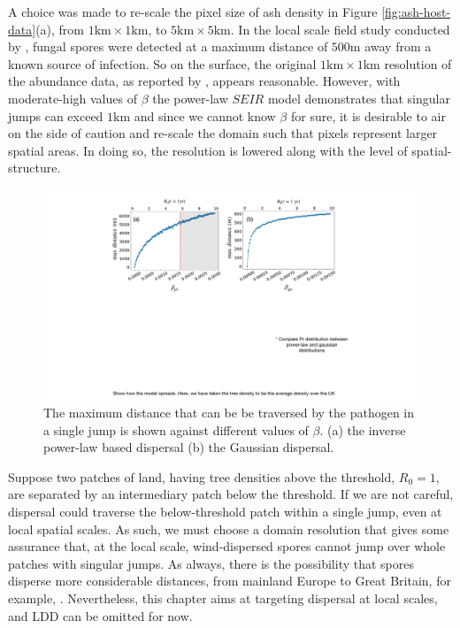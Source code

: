 A choice was made to re-scale the pixel size of ash density in Figure \ref{fig:ash-host-data}(a), from $1\mathrm{km} \times 1 \mathrm{km}$, to $5\mathrm{km} \times 5 \mathrm{km}$. In the local scale field study conducted by \cite{grosdidier2018tracking}, fungal spores were detected at a maximum distance of $500\mathrm{m}$ away from a known source of infection. So on the surface, the original $1\mathrm{km} \times 1 \mathrm{km}$ resolution of the abundance data, as reported by \cite{hill.data}, appears reasonable. However, with moderate-high values of $\beta$ the power-law $SEIR$ model demonstrates that singular jumps can exceed $1\mathrm{km}$ and since we cannot know $\beta$ for sure, it is desirable to air on the side of caution and re-scale the domain such that pixels represent larger spatial areas. In doing so, the resolution is lowered along with the level of spatial-structure. 

\begin{figure}
    \centering
    \includegraphics[scale=0.40]{chapter6/figures/fig5-beta-vs-max_d.pdf}
    \caption{The maximum distance that can be be traversed by the pathogen in a single jump is shown against different values of $\beta$. (a) the inverse power-law based dispersal (b) the Gaussian dispersal.}
    \label{fig:max_dist_vs_R0}
\end{figure}

Suppose two patches of land, having tree densities above the threshold, $R_0 = 1$, are separated by an intermediary patch below the threshold. If we are not careful, dispersal could traverse the below-threshold patch within a single jump, even at local spatial scales. As such, we must choose a domain resolution that gives some assurance that, at the local scale, wind-dispersed spores cannot jump over whole patches with singular jumps. As always, there is the possibility that spores disperse more considerable distances, from mainland Europe to Great Britain, for example, \cite{freer2017tree, wylder2018evidence}. Nevertheless, this chapter aims at targeting dispersal at local scales, and LDD can be omitted for now.

